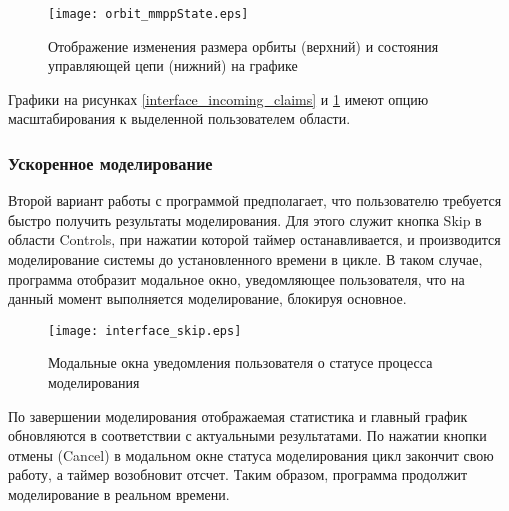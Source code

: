    \begin{figure}[H]
	\centering
	\texttt{[image: orbit\_mmppState.eps]}
	\caption{Отображение изменения размера орбиты (верхний) и состояния управляющей цепи (нижний) на графике}
	\label{interface_orbit_mmpp}
\end{figure}
Графики на рисунках \ref{interface_incoming_claims} и \ref{interface_orbit_mmpp} имеют опцию масштабирования к выделенной пользователем области.
\subsubsection{Ускоренное моделирование }
Второй вариант работы с программой предполагает, что пользователю требуется быстро получить результаты моделирования. Для этого служит кнопка Skip в области Controls, при нажатии которой таймер останавливается, и производится моделирование системы до установленного времени в цикле. В таком случае, программа отобразит модальное окно, уведомляющее пользователя, что на данный момент выполняется моделирование, блокируя основное.
 \begin{figure}[H]
	\centering
	\texttt{[image: interface\_skip.eps]}
	\caption{Модальные окна уведомления пользователя о статусе процесса моделирования}
	\label{interface_skip}
\end{figure}
По завершении моделирования отображаемая статистика и главный график обновляются в соответствии с актуальными результатами. По нажатии кнопки отмены (Cancel) в модальном окне статуса моделирования цикл закончит свою работу, а таймер возобновит отсчет. Таким образом, программа продолжит моделирование в реальном времени.  
